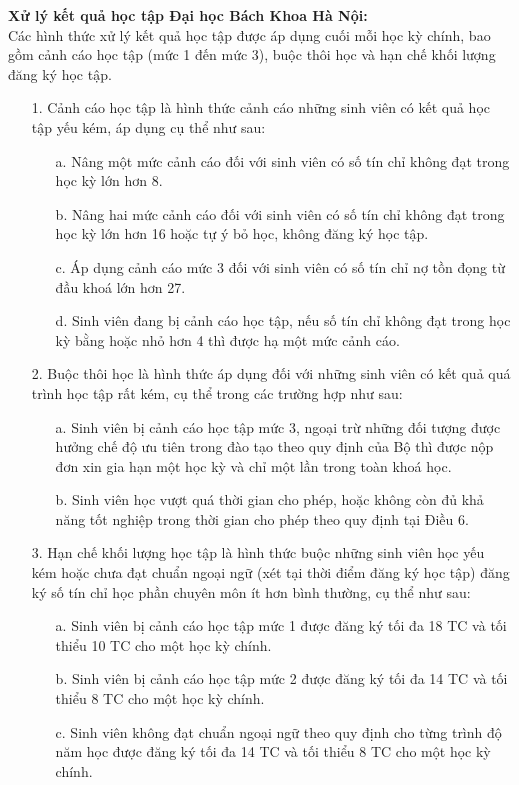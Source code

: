 \textbf{Xử lý kết quả học tập Đại học Bách Khoa Hà Nội:}\textsuperscript{\cite{daotao}} \\
Các hình thức xử lý kết quả học tập được áp dụng cuối mỗi học kỳ chính, bao gồm cảnh cáo học tập (mức 1 đến mức 3), buộc thôi học và hạn chế khối lượng đăng ký học tập.
\begin{itemize}
  \item[1.] Cảnh cáo học tập là hình thức cảnh cáo những sinh viên có kết quả học tập yếu kém, áp dụng cụ thể như sau:
    \begin{itemize}
      \item[a.] Nâng một mức cảnh cáo đối với sinh viên có số tín chỉ không đạt trong học kỳ lớn hơn 8.
      \item[b.] Nâng hai mức cảnh cáo đối với sinh viên có số tín chỉ không đạt trong học kỳ lớn hơn 16 hoặc tự ý bỏ học, không đăng ký học tập. 
      \item[c.] Áp dụng cảnh cáo mức 3 đối với sinh viên có số tín chỉ nợ tồn đọng từ đầu khoá lớn hơn 27.
      \item[d.] Sinh viên đang bị cảnh cáo học tập, nếu số tín chỉ không đạt trong học kỳ bằng hoặc nhỏ hơn 4 thì được hạ một mức cảnh cáo.  
    \end{itemize}
  \item[2.] Buộc thôi học là hình thức áp dụng đối với những sinh viên có kết quả quá trình học tập rất kém, cụ thể trong các trường hợp như sau:
    \begin{itemize}
      \item[a.] Sinh viên bị cảnh cáo học tập mức 3, ngoại trừ những đối tượng được hưởng chế độ ưu tiên trong đào tạo theo quy định của Bộ thì được nộp đơn xin gia hạn một học kỳ và chỉ một lần trong toàn khoá học.
      \item[b.] Sinh viên học vượt quá thời gian cho phép, hoặc không còn đủ khả năng tốt nghiệp trong thời gian cho phép theo quy định tại Điều 6.
    \end{itemize}
  \item[3.] Hạn chế khối lượng học tập là hình thức buộc những sinh viên học yếu kém hoặc chưa đạt chuẩn ngoại ngữ (xét tại thời điểm đăng ký học tập) đăng ký số tín chỉ học phần chuyên môn ít hơn bình thường, cụ thể như sau:
    \begin{itemize}
      \item[a.] Sinh viên bị cảnh cáo học tập mức 1 được đăng ký tối đa 18 TC và tối thiểu 10 TC cho một học kỳ chính.
      \item[b.] Sinh viên bị cảnh cáo học tập mức 2 được đăng ký tối đa 14 TC và tối thiểu 8 TC cho một học kỳ chính.
      \item[c.] Sinh viên không đạt chuẩn ngoại ngữ theo quy định cho từng trình độ năm học được đăng ký tối đa 14 TC và tối thiểu 8 TC cho một học kỳ chính.  
    \end{itemize}
\end{itemize}

